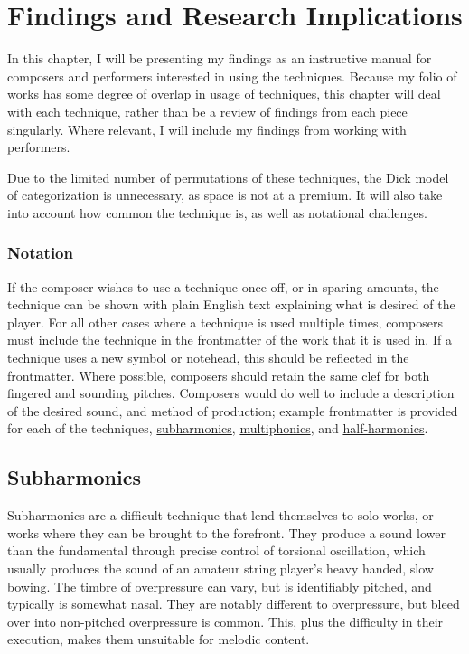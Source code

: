 
\chapter{Findings and Research Implications}\label{ch:chapter4}
In this chapter, I will be presenting my findings as an instructive manual for composers and performers interested in using the techniques.
Because my folio of works has some degree of overlap in usage of techniques, this chapter will deal with each technique, rather than be a review of findings from each piece singularly.
Where relevant, I will include my findings from working with performers.

Due to the limited number of permutations of these techniques, the Dick model of categorization is unnecessary, as space is not at a premium.\autocite{dickOtherFlute1989} 
It will also take into account how common the technique is, as well as notational challenges.

\subsection{Notation}
If the composer wishes to use a technique once off, or in sparing amounts, the technique can be shown with plain English text explaining what is desired of the player.\autocite[494]{gouldBars2011}
For all other cases where a technique is used multiple times, composers must include the technique in the frontmatter of the work that it is used in.\autocite[494]{gouldBars2011}
If a technique uses a new symbol or notehead, this should be reflected in the frontmatter.
Where possible, composers should retain the same clef for both fingered and sounding pitches.\autocite[422]{gouldBars2011}
Composers would do well to include a description of the desired sound, and method of production; example frontmatter is provided for each of the techniques, \hyperref[sec:subharmonicFrontmatter]{subharmonics}, \hyperref[sec:multiphonicFrontmatter]{multiphonics}, and \hyperref[sec:halfHarmonicFrontmatter]{half-harmonics}. 


\section{Subharmonics}\label{sec:subharmonics}
Subharmonics are a difficult technique that lend themselves to solo works, or works where they can be brought to the forefront.
They produce a sound lower than the fundamental through precise control of torsional oscillation, which usually produces the sound of an amateur string player's heavy handed, slow bowing. 
The timbre of overpressure can vary, but is identifiably pitched, and typically is somewhat nasal.
They are notably different to overpressure, but bleed over into non-pitched overpressure is common.
This, plus the difficulty in their execution, makes them unsuitable for melodic content.

